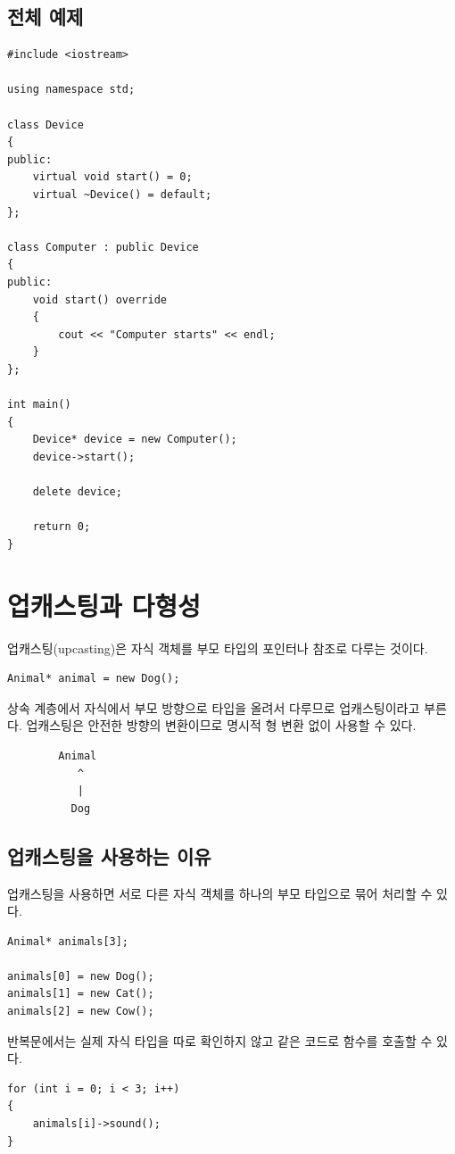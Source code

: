 \documentclass[11pt,a4paper]{article}
\begin{document}
\subsection{전체 예제}
\begin{lstlisting}
#include <iostream>

using namespace std;

class Device
{
public:
    virtual void start() = 0;
    virtual ~Device() = default;
};

class Computer : public Device
{
public:
    void start() override
    {
        cout << "Computer starts" << endl;
    }
};

int main()
{
    Device* device = new Computer();
    device->start();

    delete device;

    return 0;
}
\end{lstlisting}

\section{업캐스팅과 다형성}
업캐스팅(upcasting)은 자식 객체를 부모 타입의 포인터나 참조로 다루는 것이다.

\begin{lstlisting}
Animal* animal = new Dog();
\end{lstlisting}

상속 계층에서 자식에서 부모 방향으로 타입을 올려서 다루므로 업캐스팅이라고 부른다. 업캐스팅은 안전한 방향의 변환이므로 명시적 형 변환 없이 사용할 수 있다.

\begin{verbatim}
        Animal
           ^
           |
          Dog
\end{verbatim}

\subsection{업캐스팅을 사용하는 이유}
업캐스팅을 사용하면 서로 다른 자식 객체를 하나의 부모 타입으로 묶어 처리할 수 있다.

\begin{lstlisting}
Animal* animals[3];

animals[0] = new Dog();
animals[1] = new Cat();
animals[2] = new Cow();
\end{lstlisting}

반복문에서는 실제 자식 타입을 따로 확인하지 않고 같은 코드로 함수를 호출할 수 있다.

\begin{lstlisting}
for (int i = 0; i < 3; i++)
{
    animals[i]->sound();
}
\end{lstlisting}
\end{document}
